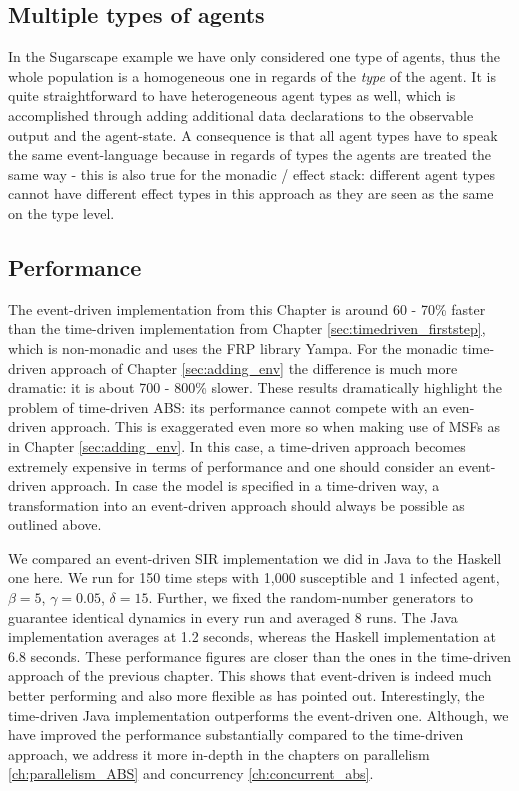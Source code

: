 \subsection{Multiple types of agents}
In the Sugarscape example we have only considered one type of agents, thus the whole population is a homogeneous one in regards of the \textit{type} of the agent. It is quite straightforward to have heterogeneous agent types as well, which is accomplished through adding additional data declarations to the observable output and the agent-state. A consequence is that all agent types have to speak the same event-language because in regards of types the agents are treated the same way - this is also true for the monadic / effect stack: different agent types cannot have different effect types in this approach as they are seen as the same on the type level.

\subsection{Performance}
The event-driven implementation from this Chapter is around 60 - 70\% faster than the time-driven implementation from Chapter \ref{sec:timedriven_firststep}, which is non-monadic and uses the FRP library Yampa. For the monadic time-driven approach of Chapter \ref{sec:adding_env} the difference is much more dramatic: it is about 700 - 800\% slower. These results dramatically highlight the problem of time-driven ABS: its performance cannot compete with an even-driven approach. This is exaggerated even more so when making use of MSFs as in Chapter \ref{sec:adding_env}. In this case, a time-driven approach becomes extremely expensive in terms of performance and one should consider an event-driven approach. In case the model is specified in a time-driven way, a transformation into an event-driven approach should always be possible as outlined above.

We compared an event-driven SIR implementation we did in Java to the Haskell one here. We run for 150 time steps with 1,000 susceptible and 1 infected agent, $\beta = 5$, $\gamma = 0.05$, $\delta = 15$. Further, we fixed the random-number generators to guarantee identical dynamics in every run and averaged 8 runs. The Java implementation averages at 1.2 seconds, whereas the Haskell implementation at 6.8 seconds. These performance figures are closer than the ones in the time-driven approach of the previous chapter. This shows that event-driven is indeed much better performing and also more flexible as \cite{meyer_event-driven_2014} has pointed out. Interestingly, the time-driven Java implementation outperforms the event-driven one. Although, we have improved the performance substantially compared to the time-driven approach, we address it more in-depth in the chapters on parallelism \ref{ch:parallelism_ABS} and concurrency \ref{ch:concurrent_abs}.

